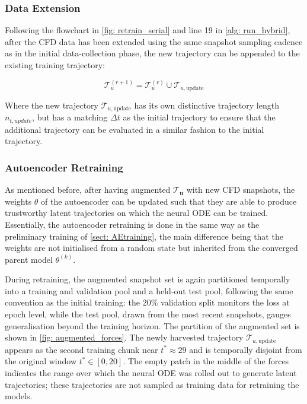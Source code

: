 \subsubsection{Data Extension}
 Following the flowchart in \autoref{fig: retrain_serial} and line 19 in \autoref{alg: run_hybrid}, after the CFD data has been extended using the same snapshot sampling cadence as in the initial data-collection phase, the new trajectory can be appended to the existing training trajectory:  

 \begin{equation}\label{eq: traju_update}
     \boldsymbol{\mathcal{T}}_u^{(r+1)} = \boldsymbol{\mathcal{T}}_u^{(r)} \cup \mathcal{T}_{u,\text{update}}
 \end{equation}
 
Where the new trajectory $\mathcal{T}_{u,\text{update}}$ has its own distinctive trajectory length $n_{t, update}$, but has a matching $\Delta t$ as the initial trajectory to ensure that the additional trajectory can be evaluated in a similar fashion to the initial trajectory.

\subsubsection{Autoencoder Retraining}
As mentioned before, after having augmented $\boldsymbol{\mathcal{T}_u}$ with new CFD snapshots, the weights $\theta$ of the autoencoder can be updated such that they are able to produce trustworthy latent trajectories on which the neural ODE can be trained. Essentially, the autoencoder retraining is done in the same way as the preliminary training of \autoref{sect: AEtraining}, the main difference being that the weights are not initialised from a random state but inherited from the converged parent model $\theta^{(k)}$.

During retraining, the augmented snapshot set is again partitioned temporally into a training and validation pool and a held-out test pool, following the same convention as the initial training: the $20\%$ validation split monitors the loss at epoch level, while the test pool, drawn from the most recent snapshots, gauges generalisation beyond the training horizon. The partition of the augmented set is shown in \autoref{fig: augmented_forces}. The newly harvested trajectory $\mathcal{T}_{u,\text{update}}$ appears as the second training chunk near $t^* \approx 29$ and is temporally disjoint from the original window $t^* \in [0, 20]$. The empty patch in the middle of the forces indicates the range over which the neural ODE was rolled out to generate latent trajectories; these trajectories are not sampled as training data for retraining the models. 

